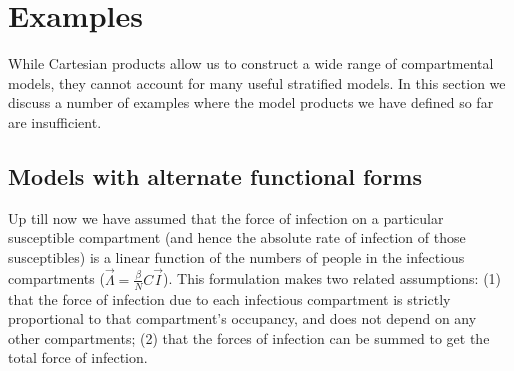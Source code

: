 \section{Examples}\label{unco}
While Cartesian products allow us to construct a wide range of compartmental models, they cannot account for many useful stratified models. In this section we discuss a number of examples where the model products we have defined so far are insufficient.

\subsection{Models with alternate functional forms}\label{aff}


Up till now we have assumed that the force of infection on a particular susceptible compartment (and hence the absolute rate of infection of those susceptibles) is a linear function of the numbers of people in the infectious compartments ($\vec{\Lambda} = \frac{\beta}{N} C \vec{I}$). This formulation makes two related assumptions: (1) that the force of infection due to each infectious compartment is strictly proportional to that compartment's occupancy, and does not depend on any other compartments; (2) that the forces of infection can be summed to get the total force of infection.

